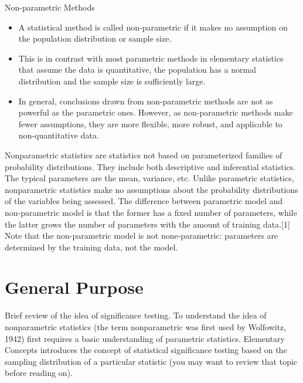 

Non-parametric Methods

\begin{itemize}
\item A statistical method is called non-parametric if it makes no assumption on the population distribution or sample size.

\item This is in contrast with most parametric methods in elementary statistics that assume the data is quantitative, the population has a normal distribution and the sample size is sufficiently large.

\item In general, conclusions drawn from non-parametric methods are not as powerful as the parametric ones. However, as non-parametric methods make fewer assumptions, they are more flexible, more robust, and applicable to non-quantitative data.
\end{itemize}

Nonparametric statistics are statistics not based on parameterized families of probability distributions. They include both descriptive and inferential statistics. The typical parameters are the mean, variance, etc. Unlike parametric statistics, nonparametric statistics make no assumptions about the probability distributions of the variables being assessed. The difference between parametric model and non-parametric model is that the former has a fixed number of parameters, while the latter grows the number of parameters with the amount of training data.[1] Note that the non-parametric model is not none-parametric: parameters are determined by the training data, not the model.
\section*{General Purpose}

Brief review of the idea of significance testing. To understand the idea of nonparametric statistics (the 
term nonparametric was first used by Wolfowitz, 1942) first requires a basic understanding of parametric 
statistics. Elementary Concepts introduces the concept of statistical significance testing based on the 
sampling distribution of a particular statistic (you may want to review that topic before reading on). 

